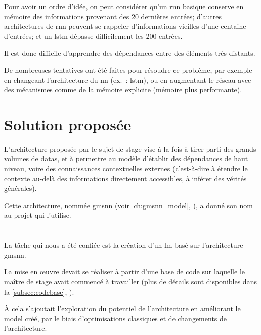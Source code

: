 Pour avoir un ordre d'idée, on peut considérer qu'un \gls{rnn} basique conserve en mémoire des informations provenant des 20 dernières entrées; d'autres architectures de \gls{rnn} peuvent se rappeler d'informations vieilles d'une centaine d'entrées; et un \gls{lstm} dépasse difficilement les 200 entrées.

Il est donc difficile d'apprendre des dépendances entre des éléments très distants.

De nombreuses tentatives ont été faites pour résoudre ce problème, par exemple en changeant l'architecture du \gls{nn} (ex.~: \gls{lstm}), ou en augmentant le réseau avec des mécanismes comme de la mémoire explicite (mémoire plus performante).

\pagebreak
\section{Solution proposée}\label{sec:soluce}
L'architecture proposée par le sujet de stage vise à la fois à tirer parti des grands volumes de \glspl{data}, et à permettre au modèle d'établir des dépendances de haut niveau, voire des connaissances contextuelles externes (c'est-à-dire à étendre le contexte au-delà des informations directement accessibles, à inférer des vérités générales).

Cette architecture, nommée \gls{gmsnn} (voir \autoref{ch:gmsnn_model}, ), a donné son nom au projet qui l'utilise.



\section{}
La tâche qui nous a été confiée est la création d'un \gls{lm} basé sur l'architecture \gls{gmsnn}.

La mise en œuvre devait se réaliser à partir d'une base de code sur laquelle le maître de stage avait commencé à travailler (plus de détails sont disponibles dans la \autoref{subsec:codebase}, ).

À cela s'ajoutait l'exploration du potentiel de l'architecture en améliorant le \gls{model} créé, par le biais d'optimisations classiques et de changements de l'architecture.

